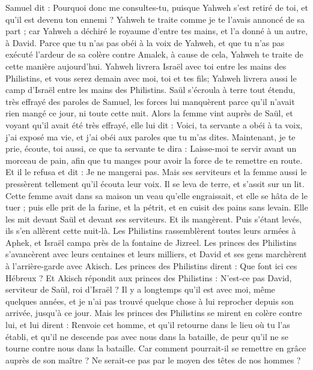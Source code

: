 \begin{multicols}{2}
Samuel dit : Pourquoi donc me consultes-tu, puisque Yahweh s'est retiré de toi, et qu'il est devenu ton ennemi ?
Yahweh te traite comme je te l'avais annoncé de sa part ; car Yahweh a déchiré le royaume d'entre tes mains, et l'a donné à un autre, à David.
Parce que tu n'as pas obéi à la voix de Yahweh, et que tu n'as pas exécuté l'ardeur de sa colère contre Amalek, à cause de cela, Yahweh te traite de cette manière aujourd'hui.
Yahweh livrera Israël avec toi entre les mains des Philistins, et vous serez demain avec moi, toi et tes fils; Yahweh livrera aussi le camp d'Israël entre les mains des Philistins.
Saül s'écroula à terre tout étendu, très effrayé des paroles de Samuel, les forces lui manquèrent parce qu'il n'avait rien mangé ce jour, ni toute cette nuit.
Alors la femme vint auprès de Saül, et voyant qu'il avait été très effrayé, elle lui dit : Voici, ta servante a obéi à ta voix, j'ai exposé ma vie, et j'ai obéi aux paroles que tu m'as dites.
Maintenant, je te prie, écoute, toi aussi, ce que ta servante te dira : Laisse-moi te servir avant un morceau de pain, afin que tu manges pour avoir la force de te remettre en route.
Et il le refusa et dit : Je ne mangerai pas. Mais ses serviteurs et la femme aussi le pressèrent tellement qu'il écouta leur voix. Il se leva de terre, et s'assit sur un lit.
Cette femme avait dans sa maison un veau qu'elle engraissait, et elle se hâta de le tuer ; puis elle prit de la farine, et la pétrit, et en cuisit des pains sans levain.
Elle les mit devant Saül et devant ses serviteurs. Et ils mangèrent. Puis s'étant levés, ils s'en allèrent cette nuit-là.
\VerseOne{}Les Philistins rassemblèrent toutes leurs armées à Aphek, et Israël campa près de la fontaine de Jizreel.
Les princes des Philistins s'avancèrent avec leurs centaines et leurs milliers, et David et ses gens marchèrent à l'arrière-garde avec Akisch.
Les princes des Philistins dirent : Que font ici ces Hébreux ? Et Akisch répondit aux princes des Philistins : N'est-ce pas David, serviteur de Saül, roi d'Israël ? Il y a longtemps qu'il est avec moi, même quelques années, et je n'ai pas trouvé quelque chose à lui reprocher depuis son arrivée, jusqu'à ce jour.
Mais les princes des Philistins se mirent en colère contre lui, et lui dirent : Renvoie cet homme, et qu'il retourne dans le lieu où tu l'as établi, et qu'il ne descende pas avec nous dans la bataille, de peur qu'il ne se tourne contre nous dans la bataille. Car comment pourrait-il se remettre en grâce auprès de son maître ? Ne serait-ce pas par le moyen des têtes de nos hommes ?

\end{multicols}
